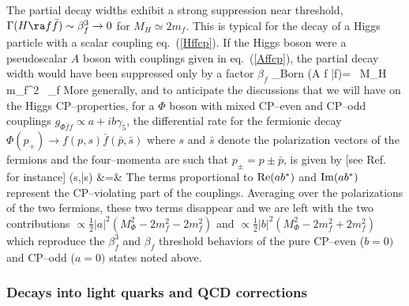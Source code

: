 The partial decay widths exhibit a strong suppression near threshold, $\Gamma
(H \ra f \bar{f}) \sim \beta_f^3 \to 0$ for $M_H \simeq 2m_f$. This is typical 
for the decay of a Higgs  particle with a scalar coupling eq.~(\ref{Hffcp}).
If the Higgs boson were a pseudoscalar $A$ boson  with couplings given in 
eq.~(\ref{Affcp}), the partial decay width would have been suppressed only by a 
factor $\beta_f$ \cite{MSSMcplgs} 
\beq
\Gamma_{\rm Born} (A \ra f \bar{f})=  \, M_H \, 
m_f^2 \, \beta_f
\eeq
More generally,  and to anticipate the discussions that we will have on the 
Higgs CP--properties, for a $\Phi$ boson with mixed CP--even and CP--odd 
couplings $g_{\Phi \bar{f}f} \propto a+ ib\gamma_5$, the differential
rate for the fermionic decay $\Phi (p_+) \to f (p,s) \bar f (\bar p, \bar s)$
where $s$ and $\bar s$ denote the polarization vectors of the fermions and 
the four--momenta are such that $p_\pm=p\pm \bar p$, is given by
[see Ref.~\cite{Hff-spin-cor} for instance]
\beq
{} (s,\bar s) &=&  
\label{dGammaHff}
\eeq 
The terms proportional to ${\rm Re}(ab^*)$ and ${\rm Im}(ab^*)$ represent the
CP--violating part of the couplings. Averaging over the polarizations of the
two fermions, these two terms disappear and we are left with  the two 
contributions $\propto \frac{1}{2} |a|^2 (M_\Phi^2 -2m_f^2 - 2m_f^2)$ 
and $\propto \frac{1}{2} |b|^2 (M_\Phi^2 -2m_f^2+ 2m_f^2)$ which reproduce
the $\beta^3_f$ and $\beta_f$ threshold behaviors of the pure CP--even ($b=0)$ 
and CP--odd ($a=0)$ states noted above. 


\subsubsection{Decays into light quarks and QCD corrections}

